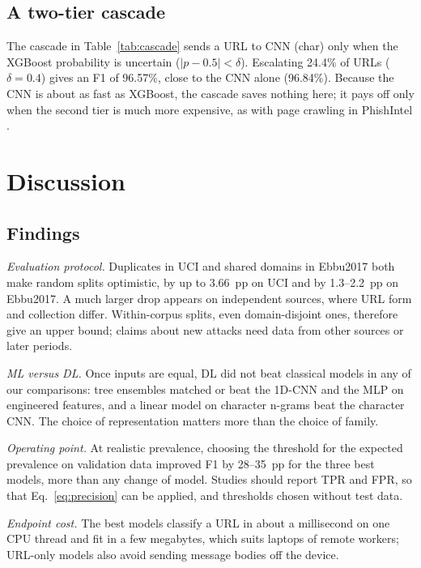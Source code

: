 \documentclass[conference]{IEEEtran}
\begin{document}


\subsection{A two-tier cascade}

The cascade in Table~\ref{tab:cascade} sends a URL to CNN (char) only when the XGBoost probability is uncertain ($|p-0.5|<\delta$). Escalating 24.4\% of URLs ($\delta=0.4$) gives an F1 of 96.57\%, close to the CNN alone (96.84\%). Because the CNN is about as fast as XGBoost, the cascade saves nothing here; it pays off only when the second tier is much more expensive, as with page crawling in PhishIntel \cite{li2024}.



\section{Discussion}\label{sec:discussion}

\subsection{Findings}

\emph{Evaluation protocol.} Duplicates in UCI and shared domains in Ebbu2017 both make random splits optimistic, by up to 3.66~pp on UCI and by 1.3--2.2~pp on Ebbu2017. A much larger drop appears on independent sources, where URL form and collection differ. Within-corpus splits, even domain-disjoint ones, therefore give an upper bound; claims about new attacks need data from other sources or later periods.

\emph{ML versus DL.} Once inputs are equal, DL did not beat classical models in any of our comparisons: tree ensembles matched or beat the 1D-CNN and the MLP on engineered features, and a linear model on character n-grams beat the character CNN. The choice of representation matters more than the choice of family.

\emph{Operating point.} At realistic prevalence, choosing the threshold for the expected prevalence on validation data improved F1 by 28--35~pp for the three best models, more than any change of model. Studies should report TPR and FPR, so that Eq.~\eqref{eq:precision} can be applied, and thresholds chosen without test data.

\emph{Endpoint cost.} The best models classify a URL in about a millisecond on one CPU thread and fit in a few megabytes, which suits laptops of remote workers; URL-only models also avoid sending message bodies off the device.
\end{document}
